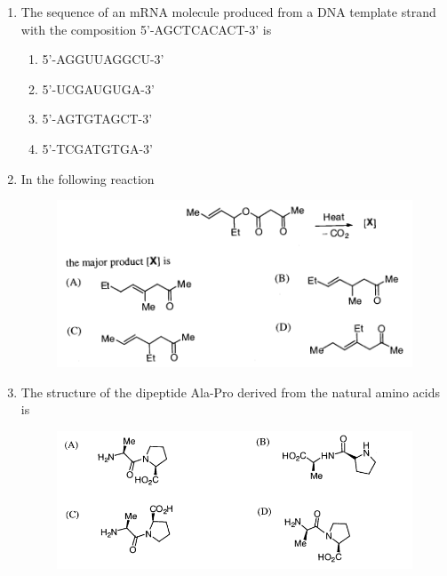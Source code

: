 \documentclass[journal,12pt,onecolumn]{IEEEtran}
\theoremstyle{remark}
\begin{document}
\begin{enumerate}
 

\newpage
\

\item    \hspace{0.5cm} The sequence of an mRNA molecule produced from a DNA template strand with the composition 5'-AGCTCACACT-3' is  \hfill{}

\begin{multicols}{2}
\begin{enumerate}
    \item 5'-AGGUUAGGCU-3'
    \item 5'-UCGAUGUGA-3'
    \item 5'-AGTGTAGCT-3'
    \item 5'-TCGATGTGA-3'
\end{enumerate}
\end{multicols}
 

\item    \hspace{0.5cm} In the following reaction  \hfill{}
\begin{figure}
    \centering
   \includegraphics[width=\textwidth]{figs/image7.png}
    \caption{}
    \label{fig:figure7}
\end{figure}

 

\item    \hspace{0.5cm} The structure of the dipeptide Ala-Pro derived from the natural amino acids is  \hfill{}
\begin{figure}
    \centering
    \includegraphics[width=\linewidth]{figs/image8.png}
    \caption{}
    \label{fig:figure8}
\end{figure}


\end{enumerate}
\end{document}
